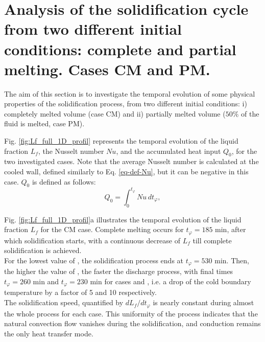 \section{Analysis of the solidification cycle from two different initial conditions: complete and partial melting. Cases CM and PM. }
 \label{sec_freezing_full} 

The aim of this section is to investigate the temporal evolution of some physical properties of the solidification process, from two different initial conditions: i) completely melted volume (case CM) and ii) partially melted volume ($50\%$ of the fluid is melted, case PM).  
 
Fig. \ref{fig:Lf_full_1D_profil} represents the temporal  evolution of the liquid fraction $L_f$, the Nusselt number $N\!u$, and the accumulated heat input  $Q_0$, for the two investigated cases.
Note that the average Nusselt number is calculated at the cooled wall, defined similarly to Eq. \ref{eq-def-Nu}, but it can be negative in this case. $Q_0$ is defined as follows:
\begin{equation}
    Q_0 = \int_0^{t_{\varphi}} N\!u \, d t_{\varphi},
    \label{eq-Q0}
\end{equation}


Fig. \ref{fig:Lf_full_1D_profil}a illustrates the temporal evolution of the liquid fraction $L_f$ for the CM case. 
Complete melting occurs for $t_{\varphi} =185$ min, after which solidification starts, with a continuous decrease of $L_f$ till complete solidification is achieved. \\
For the lowest value of , the solidification process ends at $t_{\varphi} = 530$ min. 
Then, the higher the value of , the faster the discharge process,
with final times $t_{\varphi} = 260$ min and $t_{\varphi} = 230$ min for cases  and , i.e. a drop of the cold boundary temperature by a factor of 5 and 10 respectively. \\
The solidification speed, quantified by $d L_f/ d t_{\varphi}$ is  nearly constant during almost the whole process for each case.  
This uniformity of the process indicates that the natural convection flow vanishes during the solidification, and conduction remains the only heat transfer mode.   

